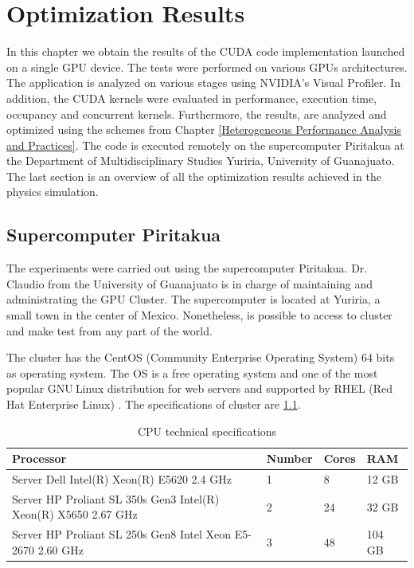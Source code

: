 
\chapter{Optimization Results} %

\label{Optimization Results} %



In this chapter we obtain the results of the CUDA code implementation launched on a single GPU device. The tests were performed on various GPUs architectures. The application is analyzed on various stages using NVIDIA's Visual Profiler. In addition, the CUDA kernels were evaluated in performance, execution time, occupancy and concurrent kernels. Furthermore, the results, are analyzed and optimized using the schemes from Chapter \ref{Heterogeneous Performance Analysis and Practices}. The code is executed remotely on the supercomputer Piritakua at the Department of Multidisciplinary Studies Yuriria, University of Guanajuato. The last section is an overview of all the optimization results achieved in the physics simulation.

\section{Supercomputer Piritakua}

The experiments were carried out using the supercomputer Piritakua. Dr. Claudio from the University of Guanajuato is in charge of maintaining and administrating the GPU Cluster. The supercomputer is located at Yuriria, a small town in the center of Mexico. Nonetheless, is possible to access to cluster and make test from any part of the world.

The cluster has the CentOS (Community Enterprise Operating System) 64 bits as operating system. The OS is a free operating system and one of the most popular GNU$ \ $Linux distribution for web servers and supported by RHEL (Red Hat Enterprise Linux) \cite{centos}. The specifications of cluster are \ref{tab:cpus}.

\begin{table}[h]
\centering
\begin{tabular}{ | p{7.1cm}  | l | l | l |}
  \hline
  Processor & Number & Cores & RAM  \\
  \hline
  Server Dell Intel(R) Xeon(R) E5620 2.4 GHz & 1 & 8 & 12 GB \\
  \hline
  Server HP Proliant SL 350s Gen3 Intel(R) Xeon(R) X5650 2.67 GHz & 2 & 24 & 32 GB \\
  \hline
   Server HP Proliant SL 250s Gen8 Intel Xeon E5-2670 2.60 GHz & 3 & 48 & 104 GB \\
   \hline
  \end{tabular}
      \caption{CPU technical specifications}
  \label{tab:cpus}
  \end{table}

